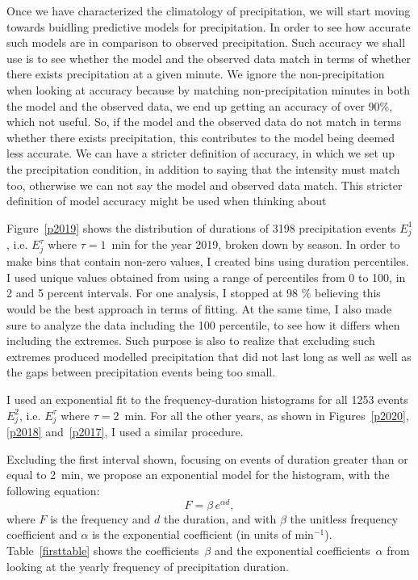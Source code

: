 \documentclass[11pt]{report}
\begin{document}
Once we have characterized the climatology of precipitation, we will start moving towards buidling predictive models for precipitation. In order to see how accurate such models are in comparison to observed precipitation. Such accuracy we shall use is to see whether the model and the observed data match in terms of whether there exists precipitation at a given minute. We ignore the non-precipitation when looking at accuracy because by matching non-precipitation minutes in both the model and the observed data, we end up getting an accuracy of over 90\%, which not useful. So, if the model and the observed data do not match in terms whether there exists precipitation, this contributes to the model being deemed less accurate. We can have a stricter definition of accuracy, in which we set up the precipitation condition, in addition to saying that the intensity must match too, otherwise we can not say the model and observed data match. This stricter definition of model accuracy might be used when thinking about 


Figure~\ref{p2019} shows the distribution of durations of 3198
precipitation events $E_j^1$, i.e. $E_j^\tau$ where $\tau=1$~min for
the year 2019, broken down by season. In order to make bins that contain non-zero values, I created bins using duration percentiles. I used unique values obtained from using a range of percentiles from 0 to 100, in 2 and 5 percent intervals. For one analysis, I stopped at 98 \% believing this would be the best approach in terms of fitting. At the same time, I also made sure to analyze the data including the 100 percentile, to see how it differs when including the extremes. Such purpose is also to realize that excluding such extremes produced modelled precipitation that did not last long as well as well as the gaps between precipitation events being too small.  

I used an exponential fit to the
frequency-duration histograms for all 1253 events $E_j^2$,
i.e. $E_j^\tau$ where $\tau=2$~min. For all the other years, as shown
in Figures~\ref{p2020}, \ref{p2018} and~\ref{p2017}, I used a similar
procedure.

Excluding the first interval shown, focusing on events of duration
greater than or equal to 2~min, we propose an exponential model for
the histogram, with the following equation:
\begin{equation}\label{expod}
  F = \beta \,e^{\alpha d},
\end{equation}
where $F$ is the frequency and $d$ the duration, and with $\beta$ the
unitless frequency coefficient and $\alpha$ is the exponential
coefficient (in units of min$^{-1}$). Table~\ref{firsttable} shows the
coefficients~$\beta$ and the exponential coefficients~$\alpha$ from
looking at the yearly frequency of precipitation duration.
\end{document}
